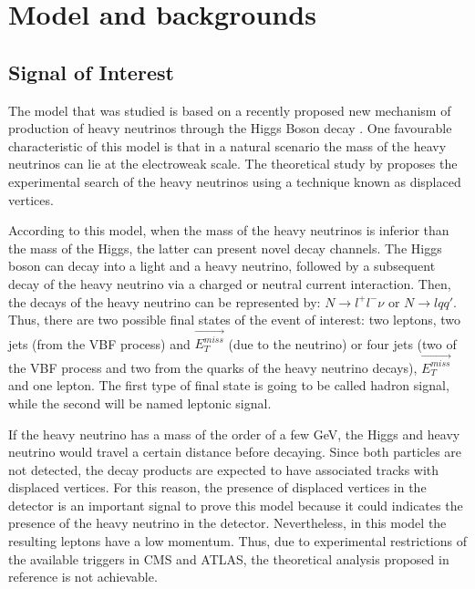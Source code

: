  \chapter{Model and backgrounds}

 
\section{Signal of Interest}

The model that was studied is based on a recently proposed new mechanism of production of heavy neutrinos through the Higgs Boson decay \cite{Seesaw Mechanism with displaced vertices}. One favourable characteristic of this model is that in a natural scenario the mass of the heavy neutrinos can lie at the electroweak scale. The theoretical study by \cite{Seesaw Mechanism with displaced vertices} proposes the experimental search of the heavy neutrinos using a technique known as displaced vertices.

According to this model, when the mass of the heavy neutrinos is inferior than the mass of the Higgs, the latter can present novel decay channels. The Higgs boson can decay into a light and a heavy neutrino, followed by a subsequent decay of the heavy neutrino via a charged or neutral current interaction. Then, the decays of the heavy neutrino can be represented by: $N \rightarrow l^+ l^- \nu$ or $N \rightarrow l q q'$. Thus, there are two possible final states of the event of interest: two leptons, two jets (from the VBF process) and $\vec{E_T^{miss}}$ (due to the neutrino) or four jets (two of the VBF process and two from the quarks of the heavy neutrino decays), $\vec{E_T^{miss}}$ and one lepton. The first type of final state is going to be called hadron signal, while the second will be named leptonic signal.

If the heavy neutrino has a mass of the order of a few GeV, the Higgs and heavy neutrino would travel a certain distance before decaying. Since both particles are not detected, the decay products are expected to have associated tracks with displaced vertices. For this reason, the presence of displaced vertices in the detector is an important signal to prove this model because it could indicates the presence of the heavy neutrino in the detector. Nevertheless, in this model the resulting leptons have a low momentum. Thus, due to experimental restrictions of the available triggers in CMS and ATLAS, the theoretical analysis proposed in reference \cite{Seesaw Mechanism with displace vertices} is not achievable.  

